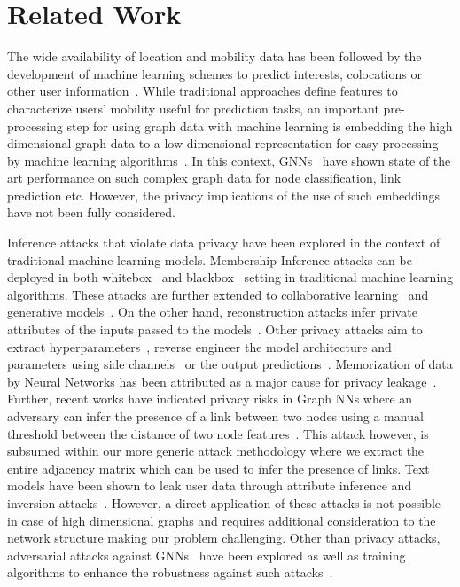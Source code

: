 \section{Related Work}
\label{related}

The wide availability of location and mobility data has been followed by the development of machine learning schemes to predict interests, colocations or other user information~\cite{noulas2009inferring}. 
While traditional approaches define features to characterize users’ mobility useful for prediction tasks, an important pre-processing step for using graph data with machine learning is embedding the high dimensional graph data to a low dimensional representation for easy processing by machine learning algorithms~\cite{yang2019revisiting}.
In this context, GNNs~\cite{zhou2018graph} have shown state of the art performance on such complex graph data for node classification, link prediction etc.
However, the privacy implications of the use of such embeddings have not been fully considered.

Inference attacks that violate data privacy have been explored in the context of traditional machine learning models.
Membership Inference attacks can be deployed in both whitebox~\cite{whitebox} and blackbox~\cite{membershipinf} setting in traditional machine learning algorithms.
These attacks are further extended to collaborative learning~\cite{collabinf,whitebox} and generative models~\cite{logan}.
On the other hand, reconstruction attacks infer private attributes of the inputs passed to the models~\cite{attributeinf, attributeinf2, propertyinf, modelinversion}.
Other privacy attacks aim to extract hyperparameters~\cite{8418595}, reverse engineer the model architecture and parameters using side channels~\cite{timing} or the output predictions~\cite{stealml}.
Memorization of data by Neural Networks has been attributed as a major cause for privacy leakage~\cite{memorize,secretsharer,overlearninginf}.
%
Further, recent works have indicated privacy risks in Graph NNs where an adversary can infer the presence of a link between two nodes using a manual threshold between the distance of two node features~\cite{linksteal}.
This attack however, is subsumed within our more generic attack methodology where we extract the entire adjacency matrix which can be used to infer the presence of links.
Text models have been shown to leak user data through attribute inference and inversion attacks~\cite{textembleak,nlp}. 
However, a direct application of these attacks is not possible in case of high dimensional graphs and requires additional consideration to the network structure making our problem challenging.
Other than privacy attacks, adversarial attacks against GNNs~\cite{graphatt,nodepoison} have been explored as well as training algorithms to enhance the robustness against such attacks~\cite{robustdef1,robustdef2}.

